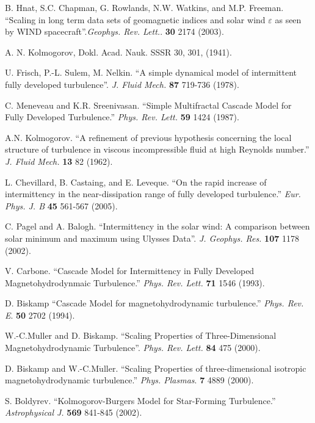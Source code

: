\documentclass[aps,prl,amsmath,amssymb,reprint,superscriptaddress]{revtex4-1} %
\begin{document}
\begin{thebibliography}{99}
 B. Hnat, S.C. Chapman, G. Rowlands, N.W. Watkins, and M.P. Freeman. ``Scaling in long term data sets of geomagnetic indices and solar wind $\varepsilon$ as seen by WIND spacecraft''.{\it Geophys. Rev. Lett.}. {\bf 30} 2174 (2003).

 A. N. Kolmogorov, Dokl. Acad. Nauk. SSSR 30, 301, (1941).

 U. Frisch, P.-L. Sulem, M. Nelkin. ``A simple dynamical model of intermittent fully developed turbulence''. {\it J. Fluid Mech.} {\bf 87} 719-736 (1978).

 C. Meneveau and K.R. Sreenivasan. ``Simple Multifractal Cascade Model for Fully Developed Turbulence.'' {\it Phys. Rev. Lett.} {\bf 59} 1424 (1987).

 A.N. Kolmogorov. ``A refinement of previous hypothesis concerning the local structure of turbulence in viscous incompressible fluid at high Reynolds number.'' {\it J. Fluid Mech.} {\bf 13} 82 (1962).

 L. Chevillard, B. Castaing, and E. Leveque. ``On the rapid increase of intermittency in the near-dissipation range of fully developed turbulence.'' {\it Eur. Phys. J. B} {\bf 45} 561-567 (2005).

 C. Pagel and A. Balogh. ``Intermittency in the solar wind: A comparison between solar minimum and maximum using Ulysses Data''. {\it J. Geophys. Res.} {\bf 107} 1178 (2002).

 V. Carbone. ``Cascade Model for Intermittency in Fully Developed Magnetohydrodynmaic Turbulence.'' {\it Phys. Rev. Lett.} {\bf 71} 1546 (1993).

 D. Biskamp ``Cascade Model for magnetohydrodynamic turbulence.'' {\it Phys. Rev. E}. {\bf 50} 2702 (1994).

 W.-C.M$\ddot{\mathrm{u}}$ller and D. Biskamp. ``Scaling Properties of Three-Dimensional Magnetohydrodynamic Turbulence''. {\it Phys. Rev. Lett.} {\bf 84} 475 (2000).

 D. Biskamp and W.-C.M$\ddot{\mathrm{u}}$ller. ``Scaling Properties of three-dimensional isotropic magnetohydrodynamic turbulence.'' {\it Phys. Plasmas}. {\bf 7} 4889 (2000).

 S. Boldyrev. ``Kolmogorov-Burgers Model for Star-Forming Turbulence.'' {\it Astrophysical J.} {\bf 569} 841-845 (2002).


\end{thebibliography}
\end{document}
